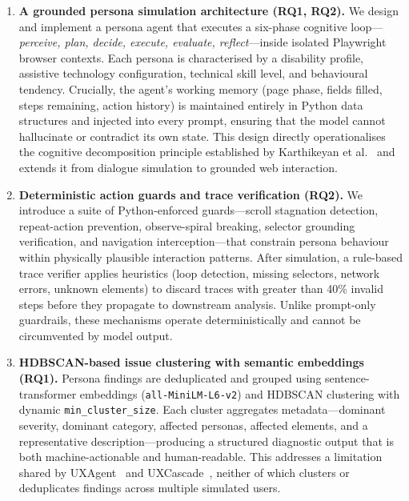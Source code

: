 \begin{enumerate}
  \item \textbf{A grounded persona simulation architecture (RQ1, RQ2).} We design and implement a persona agent that executes a six-phase cognitive loop---\textit{perceive, plan, decide, execute, evaluate, reflect}---inside isolated Playwright browser contexts. Each persona is characterised by a disability profile, assistive technology configuration, technical skill level, and behavioural tendency. Crucially, the agent's working memory (page phase, fields filled, steps remaining, action history) is maintained entirely in Python data structures and injected into every  prompt, ensuring that the model cannot hallucinate or contradict its own state. This design directly operationalises the cognitive decomposition principle established by Karthikeyan et al.~\cite{agenticpersona} and extends it from dialogue simulation to grounded web interaction.

  \item \textbf{Deterministic action guards and trace verification (RQ2).} We introduce a suite of Python-enforced guards---scroll stagnation detection, repeat-action prevention, observe-spiral breaking, selector grounding verification, and navigation interception---that constrain persona behaviour within physically plausible interaction patterns. After simulation, a rule-based trace verifier applies heuristics (loop detection, missing selectors, network errors, unknown elements) to discard traces with greater than 40\% invalid steps before they propagate to downstream analysis. Unlike prompt-only guardrails, these mechanisms operate deterministically and cannot be circumvented by model output.

  \item \textbf{HDBSCAN-based issue clustering with semantic embeddings (RQ1).} Persona findings are deduplicated and grouped using sentence-transformer embeddings (\texttt{all-MiniLM-L6-v2}) and HDBSCAN clustering with dynamic \texttt{min\_cluster\_size}. Each cluster aggregates metadata---dominant severity, dominant category, affected personas, affected elements, and a representative description---producing a structured diagnostic output that is both machine-actionable and human-readable. This addresses a limitation shared by UXAgent~\cite{uxagent} and UXCascade~\cite{uxcascade}, neither of which clusters or deduplicates findings across multiple simulated users.


\end{enumerate}
